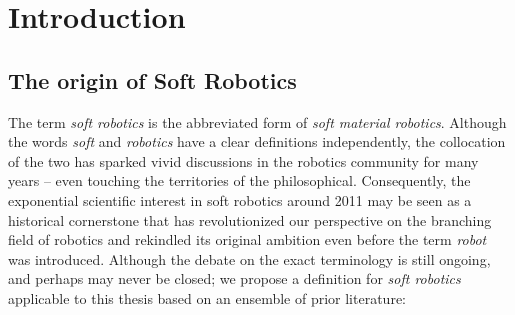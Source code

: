 \newpage
\chapter{Introduction}
\thispagestyle{empty}
\label{chap: intro}
\setcounter{page}{1}


\vspace*{-5mm}
\section{The origin of Soft Robotics}
\label{sec: chap1 motivation}
The term \emph{soft robotics} is the abbreviated form of \emph{soft material robotics}. Although the words \emph{soft} and \emph{robotics} have a clear definitions independently, the collocation of the two has sparked vivid discussions in the robotics community for many years -- even touching the territories of the philosophical. Consequently, the exponential scientific interest in soft robotics around 2011 may be seen as a historical cornerstone that has revolutionized our perspective on the branching field of robotics and rekindled its original ambition even before the term \emph{robot} was introduced. Although the debate on the exact terminology is still ongoing, and perhaps may never be closed; we propose a definition for \emph{soft robotics} applicable to this thesis based on an ensemble of prior literature:


